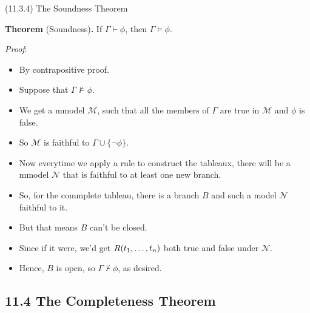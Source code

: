 \documentclass[../slides.tex]{subfiles}
\begin{document}
\begin{frame}{(11.3.4) The Soundness Theorem}

\textbf{Theorem} (Soundness)\textbf{.} If $\Gamma\vdash\phi$, then
$\Gamma\vDash\phi$.

\emph{Proof}:

\begin{itemize}
\item By contrapositive proof.
\item Suppose that $\Gamma\nvDash\phi$.
  \item We get a mmodel $\mathcal{M}$, such that all the members of
    $\Gamma$ are true in $\mathcal{M}$ and $\phi$ is false.
  \item So $\mathcal{M}$ is faithful to $\Gamma\cup\{\neg\phi\}$.
    \item Now everytime we apply a rule to construct the tableaux,
      there will be a mmodel $\mathcal{N}$ that is faithful to at
      least one new branch.
      \item So, for the commplete tableau, there is a branch $B$ and
        such a model 
        $\mathcal{N}$ faithful to it.

      \item But that means $B$ can't be closed.
        \item Since if it were, we'd get $R(t_1, \mathellipsis, t_n)$
          both true and false under $\mathcal{N}$.
          \item Hence, $B$ is open, so $\Gamma\nvdash\phi$, as desired.
\end{itemize}
  
\end{frame}

\subsection{11.4 The Completeness Theorem}
\end{document}

